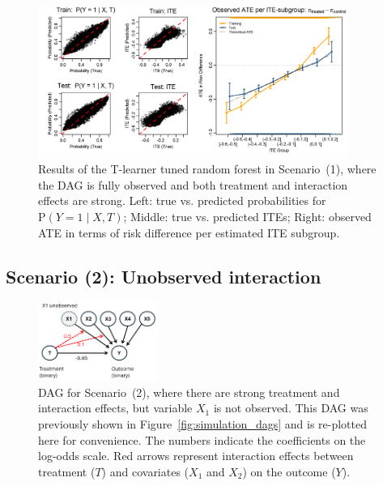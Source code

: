 \begin{figure}[htbp]
\centering
\includegraphics[width=0.9\textwidth]{img/results_ITE_simulation/fully_observed_tuned_rf_tlearner.png}
\caption{Results of the T-learner tuned random forest in Scenario~(1), where the DAG is fully observed and both treatment and interaction effects are strong. Left: true vs. predicted probabilities for $\text{P}(Y = 1 \mid X, T)$; Middle: true vs. predicted ITEs; Right: observed ATE in terms of risk difference per estimated ITE subgroup.}
\label{fig:fully_tuned_rf_tlearner}
\end{figure}


\clearpage



\subsection{Scenario (2): Unobserved interaction}

\begin{figure}[htbp]
\centering
\includegraphics[width=0.35\textwidth]{img/results_ITE_simulation/simulation_unobserved.png}
\caption{DAG for Scenario~(2), where there are strong treatment and interaction effects, but variable $X_1$ is not observed. This DAG was previously shown in Figure~\ref{fig:simulation_dags} and is re-plotted here for convenience. The numbers indicate the coefficients on the log-odds scale. Red arrows represent interaction effects between treatment ($T$) and covariates ($X_1$ and $X_2$) on the outcome ($Y$).}
\label{fig:unobserved_interaction_dag}
\end{figure}



